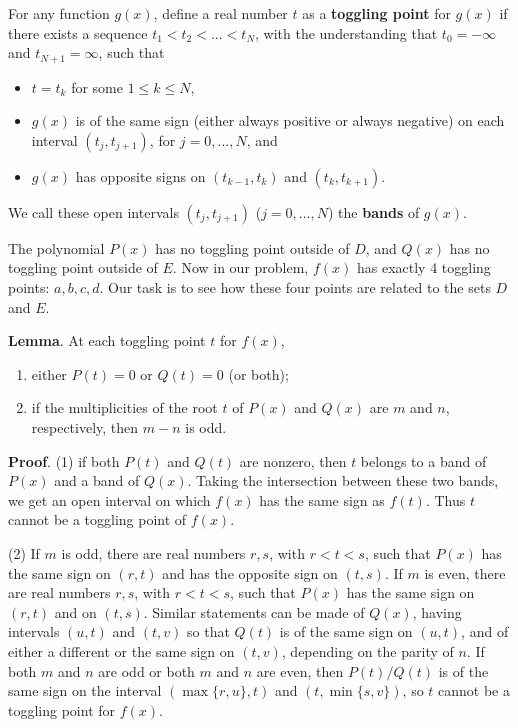 \begin{enumerate}
 
For any function $g(x)$, define a real number $t$ as a \textbf{toggling point} for $g(x)$ if there exists a sequence $t_1 < t_2 < ... < t_N$, with the understanding that $t_0 = -\infty$ and $t_{N+1} = \infty$, such that 

 
            \begin{itemize}
        \item $t = t_k$ for some $1 \leq k \leq N$,
        \item $g(x)$ is of the same sign (either always positive or always negative) on each interval $(t_j, t_{j+1})$, for $j=0, ..., N$, and
        \item $g(x)$ has opposite signs on $(t_{k-1}, t_k)$ and $(t_k, t_{k+1})$.
            \end{itemize}
            We call these open intervals $(t_j, t_{j+1})$ ($j=0, ..., N$) the \textbf{bands} of $g(x)$. 

 
The polynomial $P(x)$ has no toggling point outside of $D$, and $Q(x)$ has no toggling point outside of $E$. Now in our problem, $f(x)$ has exactly 4 toggling points: $a, b, c, d$. Our task is to see how these four points are related to the sets $D$ and $E$.  

 \textbf{Lemma}. At each toggling point $t$ for $f(x)$, 

 
            \begin{enumerate}
        \item either $P(t)=0$ or $Q(t)=0$ (or both);
        \item if the multiplicities of the root $t$ of $P(x)$ and $Q(x)$ are $m$ and $n$, respectively, then $m-n$ is odd.
            \end{enumerate}
            \textbf{Proof}. (1) if both $P(t)$ and $Q(t)$ are nonzero, then $t$ belongs to a band of $P(x)$ and a band of $Q(x)$. Taking the intersection between these two bands, we get an open interval on which $f(x)$ has the same sign as $f(t)$. Thus $t$ cannot be a toggling point of $f(x)$. 

 (2) If $m$ is odd, there are real numbers $r, s$, with $r<t<s$, such that $P(x)$ has the same sign on $(r,t)$ and has the opposite sign on $(t, s)$. If $m$ is even, there are real numbers $r, s$, with $r<t<s$, such that $P(x)$ has the same sign on $(r,t)$ and on $(t,s)$. Similar statements can be made of $Q(x)$, having intervals $(u, t)$ and $(t, v)$ so that $Q(t)$ is of the same sign on $(u,t)$, and of either a different or the same sign on $(t, v)$, depending on the parity of $n$.  If both $m$ and $n$ are odd or both $m$ and $n$ are even, then $P(t)/Q(t)$ is of the same sign on the interval $(\max\{r, u\}, t)$ and $(t, \min\{s, v\})$, so $t$ cannot be a toggling point for $f(x)$.


\end{enumerate}
